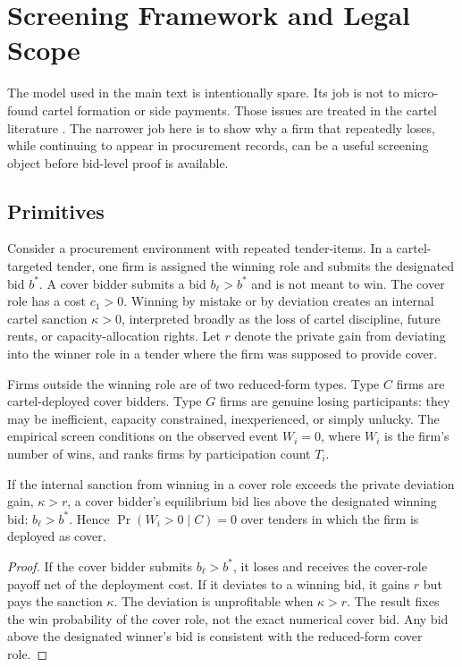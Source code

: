 \section{Screening Framework and Legal Scope}
\label{app:framework_v18}

The model used in the main text is intentionally spare. Its job
is not to micro-found cartel formation or side payments. Those
issues are treated in the cartel literature
\citep{asker2010leniency,marshall2012economics}. The narrower
job here is to show why a firm that repeatedly loses, while
continuing to appear in procurement records, can be a useful
screening object before bid-level proof is available.

\subsection{Primitives}
\label{app:framework_primitives}

Consider a procurement environment with repeated tender-items.
In a cartel-targeted tender, one firm is assigned the winning
role and submits the designated bid $b^*$. A cover bidder submits
a bid $b_\ell>b^*$ and is not meant to win. The cover role has a
cost $c_1>0$. Winning by mistake or by deviation creates an
internal cartel sanction $\kappa>0$, interpreted broadly as the
loss of cartel discipline, future rents, or capacity-allocation
rights. Let $r$ denote the private gain from deviating into the
winner role in a tender where the firm was supposed to provide
cover.

Firms outside the winning role are of two reduced-form types.
Type $C$ firms are cartel-deployed cover bidders. Type $G$ firms
are genuine losing participants: they may be inefficient,
capacity constrained, inexperienced, or simply unlucky. The
empirical screen conditions on the observed event
$W_i=0$, where $W_i$ is the firm's number of wins, and ranks
firms by participation count $T_i$.

\begin{lemma}
\label{lem:v18_zero_win}
If the internal sanction from winning in a cover role exceeds
the private deviation gain, $\kappa>r$, a cover bidder's
equilibrium bid lies above the designated winning bid:
$b_\ell>b^*$. Hence $\Pr(W_i>0\mid C)=0$ over tenders in which
the firm is deployed as cover.
\end{lemma}

\begin{proof}
If the cover bidder submits $b_\ell>b^*$, it loses and receives
the cover-role payoff net of the deployment cost. If it deviates
to a winning bid, it gains $r$ but pays the sanction $\kappa$.
The deviation is unprofitable when $\kappa>r$. The result fixes
the win probability of the cover role, not the exact numerical
cover bid. Any bid above the designated winner's bid is
consistent with the reduced-form cover role. 
\end{proof}

